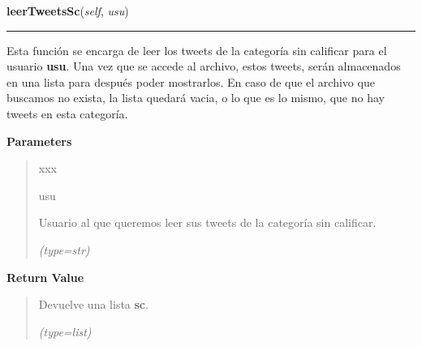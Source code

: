 \hspace{.8\funcindent}\begin{boxedminipage}{\funcwidth}

    \raggedright \textbf{leerTweetsSc}(\textit{self}, \textit{usu})

    \vspace{-1.5ex}

    \rule{\textwidth}{0.5\fboxrule}
\setlength{\parskip}{2ex}
    Esta función se encarga de leer los tweets de la categoría sin 
    calificar para el usuario \textbf{usu}. Una vez que se accede al 
    archivo, estos tweets, serán almacenados en una lista para después 
    poder mostrarlos. En caso de que el archivo que buscamos no exista, la 
    lista quedará vacia, o lo que es lo mismo, que no hay tweets en esta 
    categoría.

\setlength{\parskip}{1ex}
      \textbf{Parameters}
      \vspace{-1ex}

      \begin{quote}
        \begin{Ventry}{xxx}

          \item[usu]

          Usuario al que queremos leer sus tweets de la categoría sin 
          calificar.

            {\it (type=str)}

        \end{Ventry}

      \end{quote}

      \textbf{Return Value}
    \vspace{-1ex}

      \begin{quote}
      Devuelve una lista \textbf{sc}.

      {\it (type=list)}

      \end{quote}

    \end{boxedminipage}

    \label{funcionesTwitter:FuncionesTwitter:obtenerDiccionarioAnimales}

    \vspace{0.5ex}


